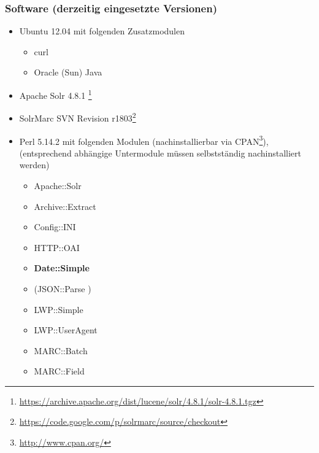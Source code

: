\documentclass[10pt]{article}
\begin{document}
\subsubsection{Software (derzeitig eingesetzte Versionen)}
\label{sec:subsub:software}
\begin{itemize}
	\item Ubuntu 12.04 mit folgenden Zusatzmodulen
	\begin{itemize}
		\item curl
		\item Oracle (Sun) Java
	\end{itemize}
	\item Apache Solr 4.8.1 \footnote{\url{https://archive.apache.org/dist/lucene/solr/4.8.1/solr-4.8.1.tgz}}
	\item SolrMarc SVN Revision r1803\footnote{\url{https://code.google.com/p/solrmarc/source/checkout}}
	\item Perl 5.14.2 mit folgenden Modulen (nachinstallierbar via CPAN\footnote{\url{http://www.cpan.org/}}), (entsprechend abhängige Untermodule müssen selbstständig nachinstalliert werden)
	\begin{itemize}
		\item Apache::Solr %
		\item Archive::Extract	%
		\item Config::INI		%
		\item HTTP::OAI 		%
		\item \textbf{Date::Simple}
		\item (JSON::Parse )	%
		\item LWP::Simple 		%
		\item LWP::UserAgent 	%
		\item MARC::Batch 		%
		\item MARC::Field 		%

\end{itemize}
\end{itemize}
\end{document}
